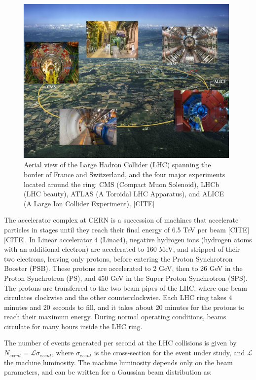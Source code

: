 \documentclass{article}
\begin{document}
\begin{figure}[ht]
    \centering
    \includegraphics[width=11cm]{figures/aerial-view-LHC-ring.jpeg}
    \caption{Aerial view of the Large Hadron Collider (LHC) spanning the border of France and Switzerland, and the four major experiments located around the ring: CMS (Compact Muon Solenoid), LHCb (LHC beauty), ATLAS (A Toroidal LHC Apparatus), and ALICE (A Large Ion Collider Experiment). [CITE]}
    \label{fig:aerial-view-LHC-ring}
\end{figure}

The accelerator complex at CERN is a succession of machines that accelerate particles in stages until they reach their final energy of 6.5 TeV per beam [CITE] [CITE]. In Linear accelerator 4 (Linac4), negative hydrogen ions (hydrogen atoms with an additional electron) are accelerated to 160 MeV, and stripped of their two electrons, leaving only protons, before entering the Proton Synchrotron Booster (PSB). These protons are accelerated to 2 GeV, then to 26 GeV in the Proton Synchrotron (PS), and 450 GeV in the Super Proton Synchrotron (SPS). The protons are transferred to the two beam pipes of the LHC, where one beam circulates clockwise and the other counterclockwise. Each LHC ring takes 4 minutes and 20 seconds to fill, and it takes about 20 minutes for the protons to reach their maximum energy. During normal operating conditions, beams circulate for many hours inside the LHC ring.

The number of events generated per second at the LHC collisions is given by $N_{event} = \mathcal{L} \sigma_{event}$, where $\sigma_{event}$ is the cross-section for the event under study, and $\mathcal{L}$ the machine luminosity. The machine luminosity depends only on the beam parameters, and can be written for a Gaussian beam distribution as:
\end{document}
